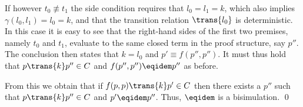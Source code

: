 If however $t_0\not\equiv t_1$ the side condition requires that $l_0=l_1 = k$, which also implies $\gamma(l_0,l_1)=l_0=k$,
and that the transition relation $\trans{l_0}$ is deterministic.
In this case it is easy to see that the right-hand sides of the first two premises, namely $t_0$ and $t_1$, evaluate to
the same closed term in the proof structure, say $p''$.
The conclusion then states that $k=l_0$ and $p'\equiv f(p'',p'')$.
It must thus hold that $p\trans{k}p''\in C$ and $f(p'',p'')\eqidem p''$ as before.

From this we obtain that if $f(p,p) \trans{k} p' \in C$ then there exists
a $p''$ such that $p \trans{k} p'' \in C$ and $p' \eqidem p''$.
Thus, $\eqidem$ is a bisimulation. \hfill \qed

